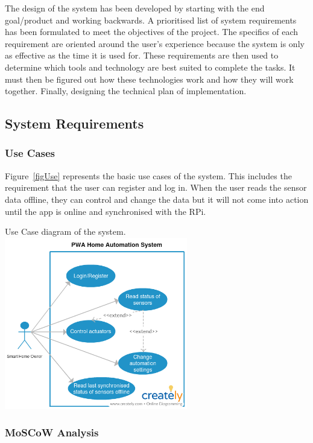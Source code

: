 \documentclass[final]{cmpreport}
\begin{document}
The design of the system has been developed by starting with the end goal/product and working backwards. A prioritised list of system requirements has been formulated to meet the objectives of the project. The specifics of each requirement are oriented around the user's experience because the system is only as effective as the time it is used for. These requirements are then used to determine which tools and technology are best suited to complete the tasks. It must then be figured out how these technologies work and how they will work together. Finally, designing the technical plan of implementation.

    \subsection{System Requirements}
        
        \subsubsection{Use Cases}
        
        Figure~\ref{figUse} represents the basic use cases of the system. This includes the requirement that the user can register and log in. When the user reads the sensor data offline, they can control and change the data but it will not come into action until the app is online and synchronised with the RPi.
        
        \begin{cmpfigure}[htb]{Use Case diagram of the system.\label{figUse}}
    	\includegraphics[width=0.6\textwidth]{Use_Case.png}
        \end{cmpfigure}
    
        \subsubsection{MoSCoW Analysis}
        
\end{document}
